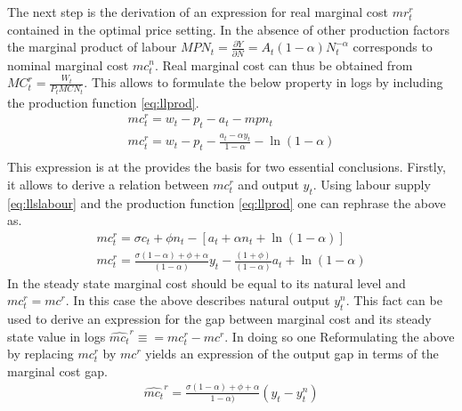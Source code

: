 \documentclass[12pt,a4paper,english]{article} %
\begin{document}
	The next step is the derivation of an expression for real marginal cost $mr_{t}^r$ contained in the optimal price setting. In the absence of other production factors the marginal product of labour $MPN_t = \frac{\partial Y}{\partial N} = A_t (1- \alpha) N_t^{-\alpha}$ corresponds to nominal marginal cost $mc_t^n$. Real marginal cost can thus be obtained from $MC_t^r = \frac{W_t}{P_t MCN_t}$. This allows to formulate the below property in logs by including the production function \ref{eq:llprod}.
	\begin{equation}
		\begin{aligned}
			mc_t^r = w_t - p_t - a_t - mpn_t \\
			mc_t^r = w_t - p_t - \frac{a_t - \alpha y_t}{1 - \alpha} - \ln(1 - \alpha) \\
		\end{aligned}
	\end{equation}
	This expression is at the provides the basis for two essential conclusions. 
	Firstly, it allows to derive a relation between $mc_t^r$ and output $y_t$. Using labour supply \ref{eq:llslabour} and the production function \ref{eq:llprod} one can rephrase the above as. 
	\begin{equation}
		\begin{aligned}
			mc_t^r = \sigma c_t + \phi n_t - [a_t + \alpha n_t + \ln(1-\alpha)] \\
			mc_t^r = 
			\frac{
				\sigma (1 - \alpha) + \phi + \alpha
			}{
				(1 - \alpha)	
			}	 y_t
			- \frac{
				(1 + \phi)	
			}{
				(1 - \alpha)	
			} a_t
			+ \ln(1-\alpha)
		\end{aligned}
	\end{equation}
	In the steady state marginal cost should be equal to its natural level and $mc_t^r = mc^r$. In this case the above describes natural output $y_t^n$. This fact can be used to derive an expression for the gap between marginal cost and its steady state value in logs $\hat{mc_t}^r \equiv = mc_t^r - mc^r$. In doing so one 
	Reformulating the above by replacing $mc_t^r$ by $mc^r$ yields an expression of the output gap in terms of the marginal cost gap. 
	\begin{equation} \label{eq:llmcrhat}
		\begin{aligned}
			\hat{mc_t}^r = \frac{\sigma (1 - \alpha) + \phi + \alpha}
			{1 - \alpha)} (y_t - y_t^n)
		\end{aligned}
	\end{equation}
\end{document}
